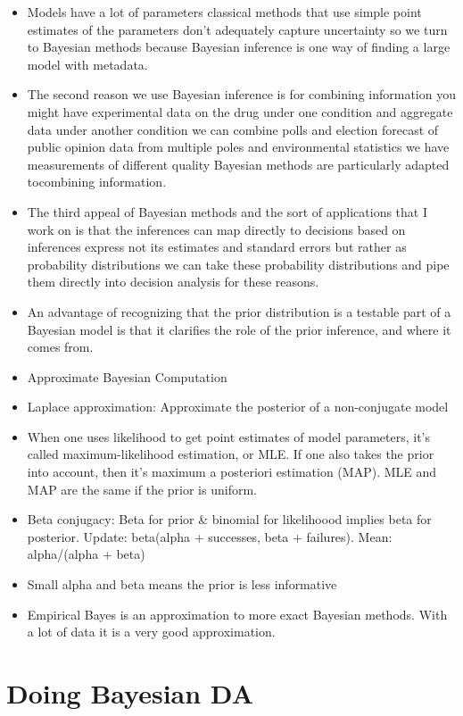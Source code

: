 \documentclass[]{book}
\begin{document}
\begin{itemize}
\item
  Models have a lot of parameters classical methods that use simple
  point estimates of the parameters don't adequately capture uncertainty
  so we turn to Bayesian methods because Bayesian inference is one way
  of finding a large model with metadata.
\item
  The second reason we use Bayesian inference is for combining
  information you might have experimental data on the drug under one
  condition and aggregate data under another condition we can combine
  polls and election forecast of public opinion data from multiple poles
  and environmental statistics we have measurements of different quality
  Bayesian methods are particularly adapted tocombining information.
\item
  The third appeal of Bayesian methods and the sort of applications that
  I work on is that the inferences can map directly to decisions based
  on inferences express not its estimates and standard errors but rather
  as probability distributions we can take these probability
  distributions and pipe them directly into decision analysis for these
  reasons.
\item
  An advantage of recognizing that the prior distribution is a testable
  part of a Bayesian model is that it clarifies the role of the prior
  inference, and where it comes from.
\item
  Approximate Bayesian Computation
\item
  Laplace approximation: Approximate the posterior of a non-conjugate
  model
\item
  When one uses likelihood to get point estimates of model parameters,
  it's called maximum-likelihood estimation, or MLE. If one also takes
  the prior into account, then it's maximum a posteriori estimation
  (MAP). MLE and MAP are the same if the prior is uniform.
\item
  Beta conjugacy: Beta for prior \& binomial for likelihoood implies
  beta for posterior. Update: beta(alpha + successes, beta + failures).
  Mean: alpha/(alpha + beta)
\item
  Small alpha and beta means the prior is less informative
\item
  Empirical Bayes is an approximation to more exact Bayesian methods.
  With a lot of data it is a very good approximation.
\end{itemize}

\section{Doing Bayesian DA}\label{doing-bayesian-da}
\end{document}
